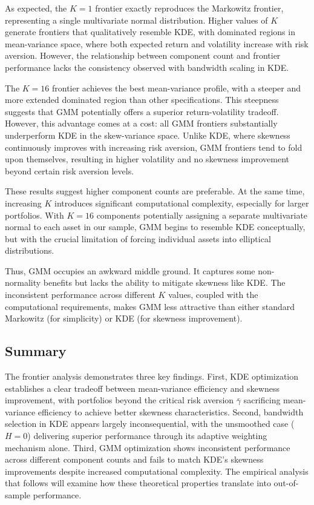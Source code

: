 As expected, the $K=1$ frontier exactly reproduces the Markowitz frontier, representing a single multivariate normal distribution. Higher values of $K$ generate frontiers that qualitatively resemble KDE, with dominated regions in mean-variance space, where both expected return and volatility increase with risk aversion. However, the relationship between component count and frontier performance lacks the consistency observed with bandwidth scaling in KDE.

The $K=16$ frontier achieves the best mean-variance profile, with a steeper and more extended dominated region than other specifications. This steepness suggests that GMM potentially offers a superior return-volatility tradeoff. However, this advantage comes at a cost: all GMM frontiers substantially underperform KDE in the skew-variance space. Unlike KDE, where skewness continuously improves with increasing risk aversion, GMM frontiers tend to fold upon themselves, resulting in higher volatility and no skewness improvement beyond certain risk aversion levels.

These results suggest higher component counts are preferable. At the same time, increasing $K$ introduces significant computational complexity, especially for larger portfolios. With $K=16$ components potentially assigning a separate multivariate normal to each asset in our sample, GMM begins to resemble KDE conceptually, but with the crucial limitation of forcing individual assets into elliptical distributions.

\newpage
Thus, GMM occupies an awkward middle ground. It captures some non-normality benefits but lacks the ability to mitigate skewness like KDE. The inconsistent performance across different $K$ values, coupled with the computational requirements, makes GMM less attractive than either standard Markowitz (for simplicity) or KDE (for skewness improvement).

\subsection{Summary}
The frontier analysis demonstrates three key findings. First, KDE optimization establishes a clear tradeoff between mean-variance efficiency and skewness improvement, with portfolios beyond the critical risk aversion $\bar{\gamma}$ sacrificing mean-variance efficiency to achieve better skewness characteristics. Second, bandwidth selection in KDE appears largely inconsequential, with the unsmoothed case ($H=0$) delivering superior performance through its adaptive weighting mechanism alone. Third, GMM optimization shows inconsistent performance across different component counts and fails to match KDE's skewness improvements despite increased computational complexity. The empirical analysis that follows will examine how these theoretical properties translate into out-of-sample performance.